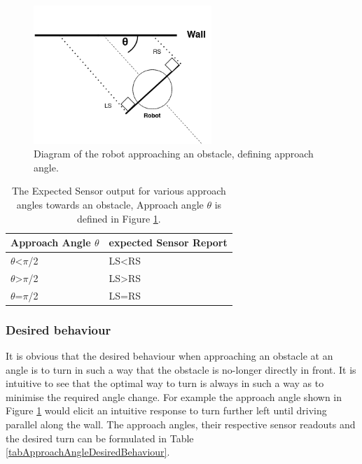\documentclass[11pt]{article}
\numberwithin{equation}{section}
\begin{document}
\begin{figure}[H]
\centering
\includegraphics[width=0.6\textwidth]{figures/robotAproachAngle.png}
\caption{\label{figDefAproachAngle}Diagram of the robot approaching an obstacle, defining approach angle.}
\end{figure}

\begin{table}[H]
\caption{\label{tabAproachAngleSensorOut}The Expected Sensor output for various approach angles towards an obstacle, Approach angle \(\theta\) is defined in Figure \ref{figDefAproachAngle}.}
\centering
\begin{tabular}{ll}
\toprule
Approach Angle \(\theta\) & expected Sensor Report\\
\midrule
\(\theta\)<\(\pi\)/2 & LS<RS\\
\(\theta\)>\(\pi\)/2 & LS>RS\\
\(\theta\)=\(\pi\)/2 & LS=RS\\
\bottomrule
\end{tabular}
\end{table}

\subsubsection{Desired behaviour \label{secColisDesiderdBehaviour}}
\label{sec:orgeea829c}
It is obvious that the desired behaviour when approaching an obstacle at an angle is to turn in such a way that the obstacle is no-longer directly in front. It is intuitive to see that the optimal way to turn is always in such a way as to minimise the required angle change. For example the approach angle shown in Figure \ref{figDefAproachAngle} would elicit an intuitive response to turn further left until driving parallel along the wall. The approach angles, their respective sensor readouts and the desired turn can be formulated in Table \ref{tabApproachAngleDesiredBehaviour}.
\end{document}

